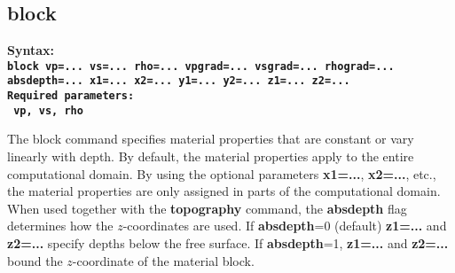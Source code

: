 \documentclass[11pt]{report}
\begin{document}
\subsection{block}
\label{keyword:block}
\begin{flushleft}\bf
Syntax:\\
\tt block
vp=... vs=... rho=... vpgrad=... vsgrad=... rhograd=... absdepth=... x1=... x2=... y1=... y2=... z1=... z2=...\\
\bf
Required parameters:\\
\tt
vp, vs, rho
\end{flushleft}
%
The block command specifies material properties that are constant or vary linearly with depth. By
default, the material properties apply to the entire computational domain. By using the optional
parameters {\bf x1=...}, {\bf x2=...}, etc., the material properties are only assigned in parts of
the computational domain. When used together with the {\bf topography} command, the {\bf absdepth}
flag determines how the $z$-coordinates are used. If {\bf absdepth}=0 (default) {\bf z1=...} and
{\bf z2=...} specify depths below the free surface. If {\bf absdepth}=1,  {\bf z1=...} and
{\bf z2=...} bound the $z$-coordinate of the material block.
\end{document}
